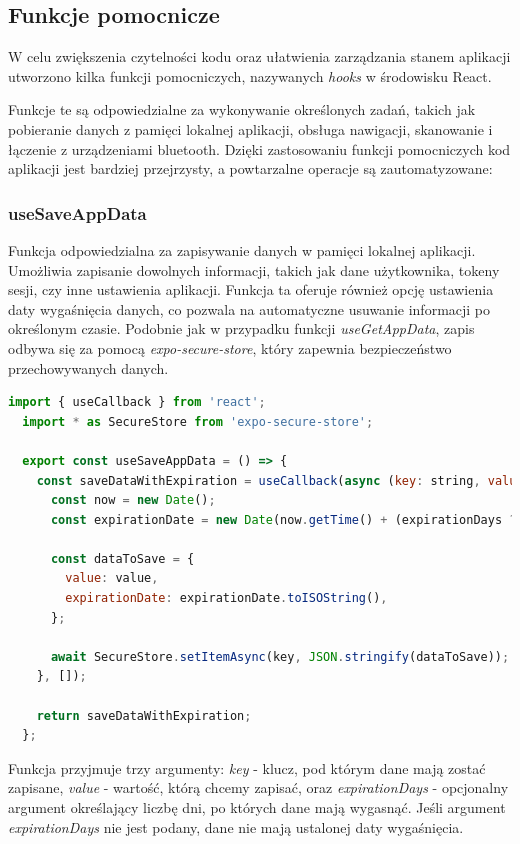 \subsection{Funkcje pomocnicze} 

W celu zwiększenia czytelności kodu oraz ułatwienia zarządzania stanem aplikacji utworzono kilka funkcji pomocniczych, nazywanych \textit{hooks} w środowisku React. 

Funkcje te są odpowiedzialne za wykonywanie określonych zadań, takich jak pobieranie danych z pamięci lokalnej aplikacji, obsługa nawigacji, skanowanie i łączenie z urządzeniami bluetooth. Dzięki zastosowaniu funkcji pomocniczych kod aplikacji jest bardziej przejrzysty, a powtarzalne operacje są zautomatyzowane:

\subsubsection{useSaveAppData} 

Funkcja odpowiedzialna za zapisywanie danych w pamięci lokalnej aplikacji. Umożliwia zapisanie dowolnych informacji, takich jak dane użytkownika, tokeny sesji, czy inne ustawienia aplikacji. Funkcja ta oferuje również opcję ustawienia daty wygaśnięcia danych, co pozwala na automatyczne usuwanie informacji po określonym czasie. Podobnie jak w przypadku funkcji \textit{useGetAppData}, zapis odbywa się za pomocą \textit{expo-secure-store}, który zapewnia bezpieczeństwo przechowywanych danych.

\begin{lstlisting}[language=JavaScript, caption=useSaveAppDataHook, label=lst:service]
  import { useCallback } from 'react';
  import * as SecureStore from 'expo-secure-store';
  
  export const useSaveAppData = () => {
    const saveDataWithExpiration = useCallback(async (key: string, value: string, expirationDays?: number) => {
      const now = new Date();
      const expirationDate = new Date(now.getTime() + (expirationDays ? expirationDays * 24 * 60 * 60 * 1000 : 0));

      const dataToSave = {
        value: value,
        expirationDate: expirationDate.toISOString(),
      };

      await SecureStore.setItemAsync(key, JSON.stringify(dataToSave));
    }, []);

    return saveDataWithExpiration;
  };
\end{lstlisting}
    
Funkcja przyjmuje trzy argumenty: \textit{key} - klucz, pod którym dane mają zostać zapisane, \textit{value} - wartość, którą chcemy zapisać, oraz \textit{expirationDays} - opcjonalny argument określający liczbę dni, po których dane mają wygasnąć. Jeśli argument \textit{expirationDays} nie jest podany, dane nie mają ustalonej daty wygaśnięcia. 

